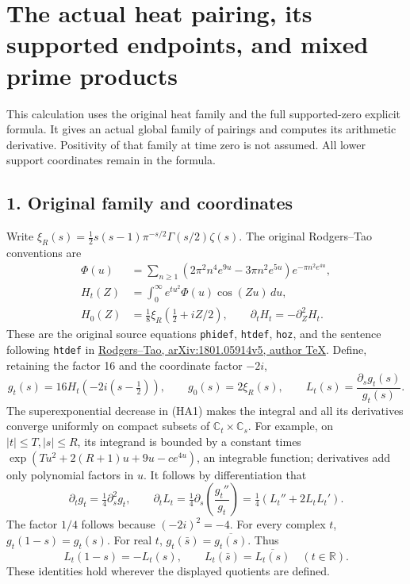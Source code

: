 \documentclass[
  10pt,
  a4paper,
]{article}
\begin{document}
\clearpage

\section{The actual heat pairing, its supported endpoints, and mixed
prime
products}\label{the-actual-heat-pairing-its-supported-endpoints-and-mixed-prime-products}

This calculation uses the original heat family and the full
supported-zero explicit formula. It gives an actual global family of
pairings and computes its arithmetic derivative. Positivity of that
family at time zero is not assumed. All lower support coordinates remain
in the formula.

\subsection{1. Original family and
coordinates}\label{original-family-and-coordinates}

Write \(\xi_R(s)=\tfrac12s(s-1)\pi^{-s/2}\Gamma(s/2)\zeta(s)\). The
original Rodgers--Tao conventions are \[
\begin{split}
\Phi(u)&=\sum_{n\ge1}(2\pi^2n^4e^{9u}-3\pi n^2e^{5u})e^{-\pi n^2e^{4u}},\\
H_t(Z)&=\int_0^\infty e^{tu^2}\Phi(u)\cos(Zu)\,du,\\
H_0(Z)&=\tfrac18\xi_R(\tfrac12+iZ/2),\qquad
\partial_tH_t=-\partial_Z^2H_t.
\end{split}\tag{HA1}
\] These are the original source equations \texttt{phidef},
\texttt{htdef}, \texttt{hoz}, and the sentence following \texttt{htdef}
in \href{https://arxiv.org/src/1801.05914v5}{Rodgers--Tao,
arXiv:1801.05914v5, author TeX}. Define, retaining the factor 16 and the
coordinate factor \(-2i\), \[
g_t(s)=16H_t(-2i(s-\tfrac12)),\qquad g_0(s)=2\xi_R(s),
\qquad L_t(s)=\frac{\partial_sg_t(s)}{g_t(s)}.
\tag{HA2}
\] The superexponential decrease in (HA1) makes the integral and all its
derivatives converge uniformly on compact subsets of
\(\mathbb C_t\times\mathbb C_s\). For example, on \(|t|\le T,|s|\le R\),
its integrand is bounded by a constant times
\(\exp(Tu^2+2(R+1)u+9u-ce^{4u})\), an integrable function; derivatives
add only polynomial factors in \(u\). It follows by differentiation that
\[
\partial_tg_t=\tfrac14\partial_s^2g_t,\qquad
\partial_tL_t=\tfrac14\partial_s\left(\frac{g_t''}{g_t}\right)
=\tfrac14(L_t''+2L_tL_t').
\tag{HA3}
\] The factor \(1/4\) follows because \((-2i)^2=-4\). For every complex
\(t\), \(g_t(1-s)=g_t(s)\). For real \(t\),
\(g_t(\bar s)=\overline{g_t(s)}\). Thus \[
L_t(1-s)=-L_t(s),\qquad
L_t(\bar s)=\overline{L_t(s)}\quad(t\in\mathbb R).
\tag{HA4}
\] These identities hold wherever the displayed quotients are defined.
\end{document}
